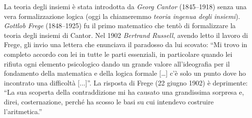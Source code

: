 \label{nota:Cantor}%
%
\label{nota:Russell}%
%
\label{nota:Frege}%
%
La teoria degli insiemi
è stata introdotta da \emph{Georg Cantor} (1845--1918) senza una vera formalizzazione logica
(oggi la chiameremmo \emph{teoria ingenua degli insiemi}).
\emph{Gottlob Frege} (1848--1925) fu il primo matematico che tentò di formalizzare 
la teoria degli insiemi di Cantor. 
Nel 1902 \emph{Bertrand Russell}, avendo letto il lavoro di Frege, 
gli invio una lettera che enunciava il paradosso da lui scovato:
``Mi trovo in completo accordo con lei in tutte le parti essenziali, in particolare
quando lei rifiuta ogni elemento psicologico dando un grande valore
all'ideografia %
per il fondamento della matematica e della logica formale [\dots] c'è solo
un punto dove ho incontrato una difficoltà [...]''.
La risposta di Frege (22 giugno 1902) è deprimente:
``La sua scoperta della contraddizione mi ha causato una grandissima sorpresa e,
direi, costernazione, perché ha scosso le basi su cui intendevo costruire l'aritmetica.''
